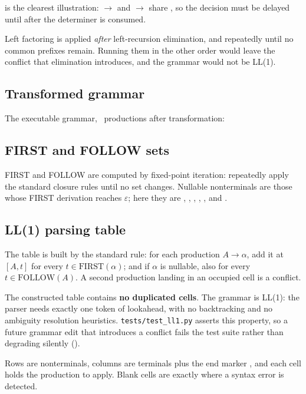  is the clearest illustration:  $\rightarrow$  
and  $\rightarrow$    share , so the
decision must be delayed until after the determiner is consumed.

\begin{keypoint}
Left factoring is applied \emph{after} left-recursion elimination, and repeatedly until no
common prefixes remain. Running them in the other order would leave the  conflict
that elimination introduces, and the grammar would not be LL(1).
\end{keypoint}

\subsection{Transformed grammar}

The executable grammar, \ExecProductionCount\ productions after transformation:



\subsection{FIRST and FOLLOW sets}

FIRST and FOLLOW are computed by fixed-point iteration: repeatedly apply the standard
closure rules until no set changes. Nullable nonterminals are those whose FIRST derivation
reaches $\varepsilon$; here they are , ,
, , ,  and
.



\subsection{LL(1) parsing table}

The table is built by the standard rule: for each production $A \rightarrow \alpha$, add it
at $[A, t]$ for every $t \in \mathrm{FIRST}(\alpha)$; and if $\alpha$ is nullable, also for
every $t \in \mathrm{FOLLOW}(A)$. A second production landing in an occupied cell is a
conflict.

\begin{keypoint}
The constructed table contains \textbf{no duplicated cells}. The grammar is LL(1): the
parser needs exactly one token of lookahead, with no backtracking and no ambiguity
resolution heuristics. \texttt{tests/test\_ll1.py} asserts this property, so a future
grammar edit that introduces a conflict fails the test suite rather than degrading silently
().
\end{keypoint}

Rows are nonterminals, columns are terminals plus the end marker \term{\$}, and each cell
holds the production to apply. Blank cells are exactly where a syntax error is detected.

\begin{landscape}

\end{landscape}
